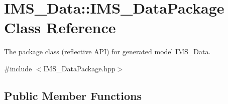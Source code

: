 \hypertarget{classIMS__Data_1_1IMS__DataPackage}{
\section{IMS\_\-Data::IMS\_\-DataPackage Class Reference}
\label{classIMS__Data_1_1IMS__DataPackage}
}


The package class (reflective API) for generated model IMS\_\-Data.  




{\ttfamily \#include $<$IMS\_\-DataPackage.hpp$>$}

\subsection*{Public Member Functions}
